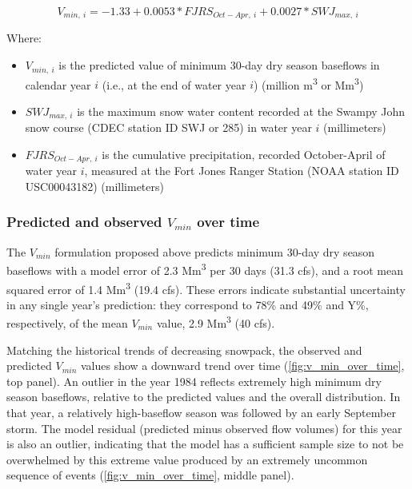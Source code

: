 \documentclass[hess, manuscript]{copernicus}
\providecommand{\tightlist}{%
  \setlength{\itemsep}{0pt}\setlength{\parskip}{0pt}}
\begin{document}
\begin{equation}
V_{min,~i} = -1.33 + 0.0053 * FJRS_{Oct-Apr,~i}+0.0027*SWJ_{max,~i}
\end{equation}

Where:

\begin{itemize}
\tightlist
\item
  \(V_{min,~i}\) is the predicted value of minimum 30-day dry season
  baseflows in calendar year \(i\) (i.e., at the end of water year
  \(i\)) (million m\textsuperscript{3} or Mm\textsuperscript{3})
\item
  \(SWJ_{max,~i}\) is the maximum snow water content recorded at the
  Swampy John snow course (CDEC station ID SWJ or 285) in water year
  \(i\) (millimeters)
\item
  \(FJRS_{Oct-Apr,~i}\) is the cumulative precipitation, recorded
  October-April of water year \(i\), measured at the Fort Jones Ranger
  Station (NOAA station ID USC00043182) (millimeters)
\end{itemize}

\subsubsection{\texorpdfstring{Predicted and observed \(V_{min}\) over
time}{Predicted and observed V\_\{min\} over time}}

The \(V_{min}\) formulation proposed above predicts minimum 30-day dry
season baseflows with a model error of 2.3 Mm\textsuperscript{3} per 30
days (31.3 cfs), and a root mean squared error of 1.4
Mm\textsuperscript{3} (19.4 cfs). These errors indicate substantial
uncertainty in any single year's prediction: they correspond to 78\% and
49\% and Y\%, respectively, of the mean \(V_{min}\) value, 2.9
Mm\textsuperscript{3} (40 cfs).

Matching the historical trends of decreasing snowpack, the observed and
predicted \(V_{min}\) values show a downward trend over time
(\autoref{fig:v_min_over_time}, top panel). An outlier in the year 1984
reflects extremely high minimum dry season baseflows, relative to the
predicted values and the overall distribution. In that year, a
relatively high-baseflow season was followed by an early September
storm. The model residual (predicted minus observed flow volumes) for
this year is also an outlier, indicating that the model has a sufficient
sample size to not be overwhelmed by this extreme value produced by an
extremely uncommon sequence of events (\autoref{fig:v_min_over_time},
middle panel).
\end{document}
